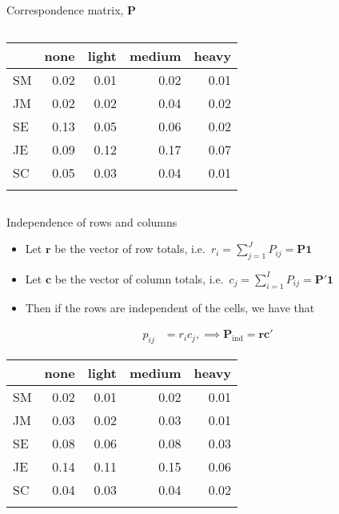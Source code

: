 \documentclass[
  ignorenonframetext,
  aspectratio=169]{beamer}
\providecommand{\tightlist}{%
  \setlength{\itemsep}{0pt}\setlength{\parskip}{0pt}}\usepackage{longtable,booktabs,array}
\begin{document}
\begin{frame}{Correspondence matrix, \(\symbf{P}\)}
\begin{columns}[T]
\begin{column}{0.525\textwidth}
\vspace{0.05cm}

\begin{longtable}[]{@{}lrrrr@{}}
\toprule\noalign{}
& none & light & medium & heavy \\
\midrule\noalign{}
\endhead
SM & 0.02 & 0.01 & 0.02 & 0.01 \\
JM & 0.02 & 0.02 & 0.04 & 0.02 \\
SE & 0.13 & 0.05 & 0.06 & 0.02 \\
JE & 0.09 & 0.12 & 0.17 & 0.07 \\
SC & 0.05 & 0.03 & 0.04 & 0.01 \\
\bottomrule\noalign{}
\end{longtable}
\end{column}
\end{columns}
\end{frame}

\begin{frame}{Independence of rows and columns}
\protect\hypertarget{independence-of-rows-and-columns}{}
\begin{itemize}
\tightlist
\item
  Let \(\symbf{r}\) be the vector of row totals,
  i.e.~\(r_i=\sum_{j=1}^J P_{ij} = \symbf{P} \symbf{1}\)
\item
  Let \(\symbf{c}\) be the vector of column totals,
  i.e.~\(c_j=\sum_{i=1}^I P_{ij} = \symbf{P}' \symbf{1}\)
\item
  Then if the rows are independent of the cells, we have that
\end{itemize}

\begin{align*}
p_{ij} &= r_ic_j,
\implies \symbf{P}_{\mathrm{ind}} = \symbf{r}\symbf{c}'
\end{align*}

\begin{longtable}[]{@{}lrrrr@{}}
\toprule\noalign{}
& none & light & medium & heavy \\
\midrule\noalign{}
\endhead
SM & 0.02 & 0.01 & 0.02 & 0.01 \\
JM & 0.03 & 0.02 & 0.03 & 0.01 \\
SE & 0.08 & 0.06 & 0.08 & 0.03 \\
JE & 0.14 & 0.11 & 0.15 & 0.06 \\
SC & 0.04 & 0.03 & 0.04 & 0.02 \\
\bottomrule\noalign{}
\end{longtable}
\end{frame}
\end{document}
